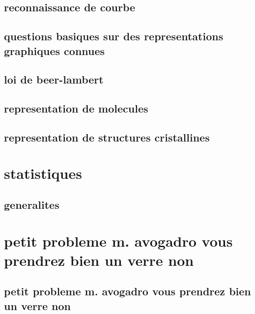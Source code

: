 \documentclass[11pt]{article}
\begin{document}
    \subsection{reconnaissance de courbe}
      
    \subsection{questions basiques sur des representations graphiques connues}
      
    \subsection{loi de beer-lambert}
      
    \subsection{representation de molecules}
      
    \subsection{representation de structures cristallines}
      
  \section{statistiques}
    \subsection{generalites}
      
  \section{petit probleme   m. avogadro  vous prendrez bien un verre  non }
    \subsection{petit probleme   m. avogadro  vous prendrez bien un verre  non }
      
\end{document}
